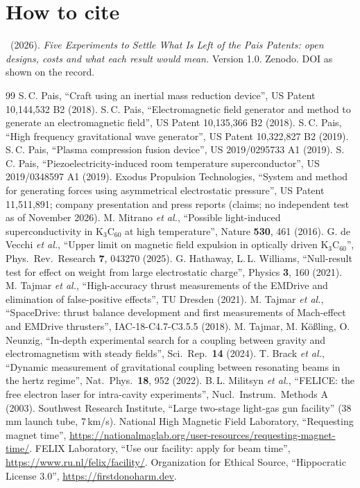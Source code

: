\documentclass[10.5pt,a4paper]{article}
\begin{document}
\section*{How to cite}
\AUTHOR\ (2026). \emph{Five Experiments to Settle What Is Left of the Pais Patents: open designs, costs and what each result would mean.} Version 1.0. Zenodo. DOI as shown on the record.

\begin{thebibliography}{99}\small
\setlength{\itemsep}{1pt}
 S.\,C. Pais, ``Craft using an inertial mass reduction device'', US Patent 10,144,532 B2 (2018).
 S.\,C. Pais, ``Electromagnetic field generator and method to generate an electromagnetic field'', US Patent 10,135,366 B2 (2018).
 S.\,C. Pais, ``High frequency gravitational wave generator'', US Patent 10,322,827 B2 (2019).
 S.\,C. Pais, ``Plasma compression fusion device'', US 2019/0295733 A1 (2019).
 S.\,C. Pais, ``Piezoelectricity-induced room temperature superconductor'', US 2019/0348597 A1 (2019).
 Exodus Propulsion Technologies, ``System and method for generating forces using asymmetrical electrostatic pressure'', US Patent 11,511,891; company presentation and press reports (claims; no independent test as of November 2026).
 M. Mitrano \emph{et al.}, ``Possible light-induced superconductivity in K$_3$C$_{60}$ at high temperature'', Nature \textbf{530}, 461 (2016).
 G. de Vecchi \emph{et al.}, ``Upper limit on magnetic field expulsion in optically driven K$_3$C$_{60}$'', Phys.\ Rev.\ Research \textbf{7}, 043270 (2025).
 G. Hathaway, L.\,L. Williams, ``Null-result test for effect on weight from large electrostatic charge'', Physics \textbf{3}, 160 (2021).
 M. Tajmar \emph{et al.}, ``High-accuracy thrust measurements of the EMDrive and elimination of false-positive effects'', TU Dresden (2021).
 M. Tajmar \emph{et al.}, ``SpaceDrive: thrust balance development and first measurements of Mach-effect and EMDrive thrusters'', IAC-18-C4.7-C3.5.5 (2018).
 M. Tajmar, M. K\"o{\ss}ling, O. Neunzig, ``In-depth experimental search for a coupling between gravity and electromagnetism with steady fields'', Sci.\ Rep.\ \textbf{14} (2024).
 T. Brack \emph{et al.}, ``Dynamic measurement of gravitational coupling between resonating beams in the hertz regime'', Nat.\ Phys.\ \textbf{18}, 952 (2022).
 B.\,L. Militsyn \emph{et al.}, ``FELICE: the free electron laser for intra-cavity experiments'', Nucl.\ Instrum.\ Methods A (2003).
 Southwest Research Institute, ``Large two-stage light-gas gun facility'' (38\,mm launch tube, 7\,km/s).
 National High Magnetic Field Laboratory, ``Requesting magnet time'', \url{https://nationalmaglab.org/user-resources/requesting-magnet-time/}.
 FELIX Laboratory, ``Use our facility: apply for beam time'', \url{https://www.ru.nl/felix/facility/}.
 Organization for Ethical Source, ``Hippocratic License 3.0'', \url{https://firstdonoharm.dev}.
\end{thebibliography}
\end{document}
